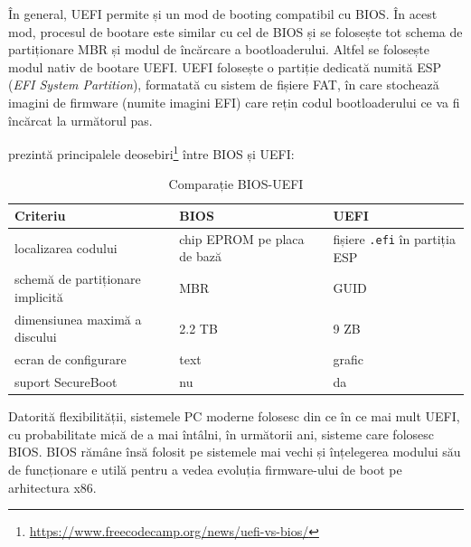 În general, UEFI permite și un mod de booting compatibil cu BIOS. În acest mod,
procesul de bootare este similar cu cel de BIOS și se folosește tot schema de
partiționare MBR și modul de încărcare a bootloaderului. Altfel se folosește
modul nativ de bootare UEFI. UEFI folosește o partiție dedicată numită ESP (\textit{EFI
System Partition}), formatată cu sistem de fișiere FAT, în care stochează imagini
de firmware (numite imagini EFI) care rețin codul bootloaderului ce va fi
încărcat la următorul pas.

 prezintă principalele deosebiri\footnote{\url{https://www.freecodecamp.org/news/uefi-vs-bios/}} între BIOS și UEFI:

\begin{table}[!htb]
  \caption{Comparație BIOS-UEFI}
  \begin{center}
    \begin{tabular}{ p{} p{} p{} }
      \toprule
        \textbf{Criteriu} &
        \textbf{BIOS} &
        \textbf{UEFI} \\
      \midrule
        localizarea codului &
        chip EPROM pe placa de bază &
        fișiere \texttt{.efi} în partiția ESP \\

        schemă de partiționare implicită &
        MBR &
        GUID \\

        dimensiunea maximă a discului &
        2.2 TB &
        9 ZB \\

        ecran de configurare &
        text &
        grafic \\

        suport SecureBoot &
        nu &
        da \\

      \bottomrule
    \end{tabular}
    \label{tab:boot:bios-uefi}
  \end{center}
\end{table}

Datorită flexibilității, sistemele PC  moderne
folosesc din ce în ce mai mult UEFI, cu probabilitate mică de a mai întâlni, în următorii ani,
sisteme care folosesc BIOS. BIOS rămâne însă folosit pe
sistemele mai vechi și înțelegerea modului său de funcționare e utilă pentru a
vedea evoluția firmware-ului de boot pe arhitectura x86.

